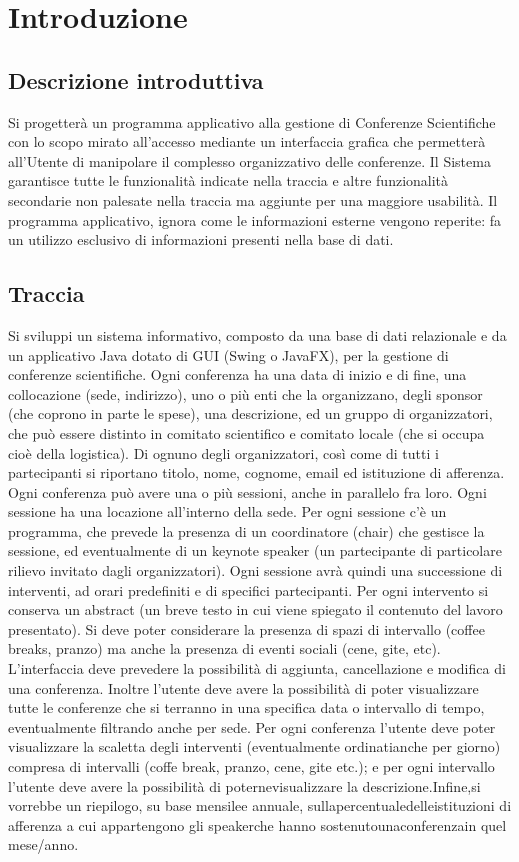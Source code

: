 \documentclass[a4paper,italian,10pt,openany]{book}
\begin{document}
    \chapter{Introduzione}
    \section{Descrizione introduttiva}
	Si progetterà un programma applicativo alla gestione di Conferenze Scientifiche con lo scopo mirato all'accesso mediante un interfaccia grafica che permetterà all'Utente di manipolare il complesso organizzativo delle conferenze. Il Sistema garantisce tutte le funzionalità indicate nella traccia e altre funzionalità secondarie non palesate nella traccia ma aggiunte per una maggiore usabilità. Il programma applicativo, ignora come le informazioni esterne vengono reperite: fa un utilizzo esclusivo di informazioni presenti nella base di dati.
	\section{Traccia}
	Si sviluppi un sistema informativo, composto da una base di dati relazionale e da un applicativo Java dotato di GUI (Swing o JavaFX), per la gestione di conferenze scientifiche. Ogni conferenza ha una data di inizio e di fine, una collocazione (sede, indirizzo), uno o più enti che la organizzano, degli sponsor (che coprono in parte le spese), una descrizione, ed un gruppo di organizzatori, che può essere distinto in comitato scientifico e comitato  locale  (che  si  occupa  cioè  della  logistica).  Di  ognuno  degli  organizzatori,  così  come  di  tutti  i partecipanti si riportano titolo, nome, cognome, email ed istituzione di afferenza. Ogni conferenza può avere una o più sessioni, anche in parallelo fra loro. Ogni sessione ha una locazione all'interno della sede. Per ogni sessione c'è un programma, che prevede la presenza di un coordinatore (chair) che gestisce la sessione, ed eventualmente di un keynote speaker (un partecipante di particolare rilievo invitato dagli organizzatori). Ogni sessione  avrà  quindi  una  successione  di  interventi,  ad  orari  predefiniti  e  di  specifici  partecipanti.  Per  ogni intervento si conserva un abstract (un breve testo in cui viene spiegato il contenuto del lavoro presentato). Si deve poter considerare la presenza di spazi di intervallo (coffee breaks, pranzo) ma anche la presenza di eventi sociali (cene, gite, etc). L’interfaccia deve prevedere la possibilità di aggiunta, cancellazione e modifica di una conferenza. Inoltre l’utente deve avere la possibilità di poter visualizzare tutte le conferenze che si terranno  in  una  specifica  data  o  intervallo  di  tempo,  eventualmente  filtrando  anche  per  sede.  Per  ogni conferenza l’utente deve poter visualizzare la scaletta degli interventi (eventualmente ordinatianche  per giorno) compresa di intervalli (coffe break, pranzo, cene, gite etc.); e per ogni intervallo l’utente deve avere la possibilità di poternevisualizzare la descrizione.Infine,si vorrebbe un riepilogo, su base mensilee annuale, sullapercentualedelleistituzioni  di  afferenza a  cui  appartengono  gli  speakerche  hanno  sostenutounaconferenzain quel mese/anno.
\end{document}
